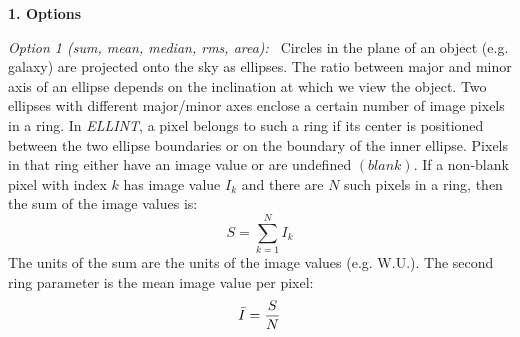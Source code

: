 \noindent
{\bf 1. Options}

\noindent
{\it Option 1 (sum, mean, median, rms, area):\ } 
Circles in the plane of an object (e.g. galaxy) are projected onto the 
sky as ellipses. The ratio between major and minor axis of an ellipse 
depends on the inclination at which we view the object.
Two ellipses with different major/minor axes enclose a certain 
number of image pixels in a ring. In {\it ELLINT}, a pixel belongs
to such a ring if its center is positioned between the two ellipse boundaries or 
on the boundary of the inner ellipse. Pixels in that ring either have an
image value or are undefined $(blank)$. 
If a non-blank pixel with index $k$ has image value $I_k$ and there are 
$N$ such pixels in a ring, then the sum of the image values is:
\begin{equation}
S = \sum_{k=1}^{N}I_k
\end{equation}
The units of the sum are the units of the image values (e.g. W.U.).
The second ring parameter is the mean image value per pixel:
\begin{equation}
\bar{I} = {S\over{N}}
\end{equation}

